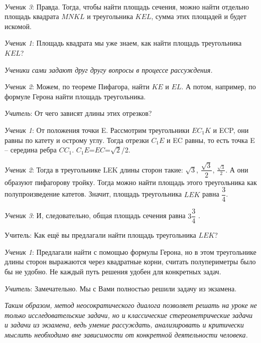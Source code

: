 \documentclass[a4paper,14pt,russian]{extreport}
\newcommand{\capt}[1]{%
    \\[8pt]
    \text{Рис. #1}
}
\begin{document}
\begin{center}
\hspace{-3.8cm}
    \begin{minipage}{0.3\textwidth}
        \centering
    \end{minipage}
    \capt{4}
\end{center}

\textit{Ученик 3}: Правда. Тогда, чтобы найти площадь сечения, можно найти отдельно площадь квадрата $MNKL$ и треугольника $KEL$, сумма этих площадей и будет искомой.

\textit{Ученик 1}: Площадь квадрата мы уже знаем, как найти площадь треугольника $KEL$? 

\textit {Ученики сами задают друг другу вопросы в процессе рассуждения.}

\textit{Ученик 2}: Можем, по теореме Пифагора, найти $KE$ и $EL$. А потом, например, по формуле Герона найти площадь треугольника.

\textit{Учитель}:  От чего зависят длины этих отрезков?

\textit{Ученик 1}: От положения точки E. Рассмотрим треугольники $EC_1K$ и ECP, они равны по катету и острому углу. Тогда отрезки $C_1E$ и EC равны, то есть точка E – середина ребра $CC_1$.  $C_1E$=$EC$=$\sqrt{2}$/2.

\textit{Ученик 2}: Тогда в треугольнике LEK длины сторон такие: $\sqrt{3}$, $\dfrac{\sqrt{3}}{2}$, $\frac {\sqrt{3}}{2}$. А они образуют пифагорову тройку. Тогда можно найти площадь этого треугольника как полупроизведение катетов. Значит, площадь треугольника $LEK$ равна $\dfrac{3}{4}$.

\textit{Ученик 3}: И, следовательно, общая площадь сечения равна $3\dfrac{3}{4}$ .

Учитель: Как ещё вы предлагали найти площадь треугольника $LEK$?

\textit{Ученик 1}: Предлагали найти с помощью формулы Герона, но в этом треугольнике длины сторон выражаются через квадратные корни, считать полупериметры было бы не удобно. Не каждый путь решения удобен для конкретных задач.

\textit{Учитель}: Замечательно. Мы с Вами полностью решили задачу из экзамена.

\textit{Таким образом, метод неосократического диалога позволяет решать на уроке не только исследовательские задачи, но и классические стереометрические задачи и задачи из экзамена, ведь умение рассуждать, анализировать и критически мыслить необходимо вне зависимости от конкретной деятельности человека.}
\end{document}

